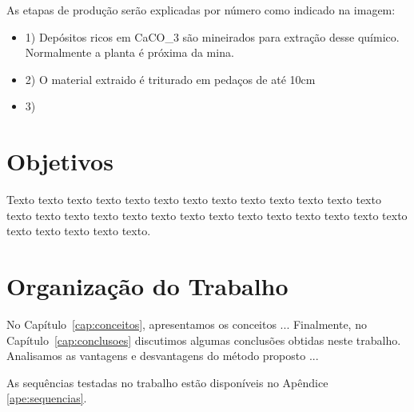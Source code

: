 As etapas de produção serão explicadas por número como indicado na imagem: \\

\begin{itemize}

\item 1) Depósitos ricos em CaCO_3 são mineirados para extração desse químico. Normalmente a planta é próxima da mina.
\item 2) O material extraido é triturado em pedaços de até 10cm
\item 3)  

\end{itemize}


\section{Objetivos}
\label{sec:objetivo}

Texto texto texto texto texto texto texto texto texto texto texto texto texto
texto texto texto texto texto texto texto texto texto texto texto texto texto
texto texto texto texto texto texto.


\section{Organização do Trabalho}
\label{sec:organizacao_trabalho}

No Capítulo~\ref{cap:conceitos}, apresentamos os conceitos ... Finalmente, no
Capítulo~\ref{cap:conclusoes} discutimos algumas conclusões obtidas neste
trabalho. Analisamos as vantagens e desvantagens do método proposto ... 

As sequências testadas no trabalho estão disponíveis no Apêndice \ref{ape:sequencias}.
